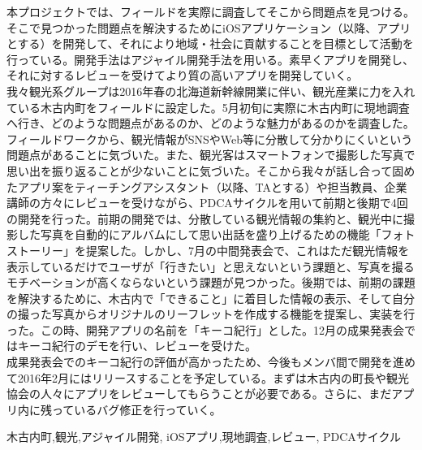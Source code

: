 \begin{jabstract}
\quad 本プロジェクトでは、フィールドを実際に調査してそこから問題点を見つける。そこで見つかった問題点を解決するためにiOSアプリケーション（以降、アプリとする）を開発して、それにより地域・社会に貢献することを目標として活動を行っている。開発手法はアジャイル開発手法を用いる。素早くアプリを開発し、それに対するレビューを受けてより質の高いアプリを開発していく。\\
\quad 我々観光系グループは2016年春の北海道新幹線開業に伴い、観光産業に力を入れている木古内町をフィールドに設定した。5月初旬に実際に木古内町に現地調査へ行き、どのような問題点があるのか、どのような魅力があるのかを調査した。フィールドワークから、観光情報がSNSやWeb等に分散して分かりにくいという問題点があることに気づいた。また、観光客はスマートフォンで撮影した写真で思い出を振り返ることが少ないことに気づいた。そこから我々が話し合って固めたアプリ案をティーチングアシスタント（以降、TAとする）や担当教員、企業講師の方々にレビューを受けながら、PDCAサイクルを用いて前期と後期で4回の開発を行った。前期の開発では、分散している観光情報の集約と、観光中に撮影した写真を自動的にアルバムにして思い出話を盛り上げるための機能「フォトストーリー」を提案した。しかし、7月の中間発表会で、これはただ観光情報を表示しているだけでユーザが「行きたい」と思えないという課題と、写真を撮るモチベーションが高くならないという課題が見つかった。後期では、前期の課題を解決するために、木古内で「できること」に着目した情報の表示、そして自分の撮った写真からオリジナルのリーフレットを作成する機能を提案し、実装を行った。この時、開発アプリの名前を「キーコ紀行」とした。12月の成果発表会ではキーコ紀行のデモを行い、レビューを受けた。\\
\quad 成果発表会でのキーコ紀行の評価が高かったため、今後もメンバ間で開発を進めて2016年2月にはリリースすることを予定している。まずは木古内の町長や観光協会の人々にアプリをレビューしてもらうことが必要である。さらに、まだアプリ内に残っているバグ修正を行っていく。\\

\begin{jkeyword}
木古内町,観光,アジャイル開発, iOSアプリ,現地調査,レビュー, PDCAサイクル
\end{jkeyword}
\end{jabstract}

